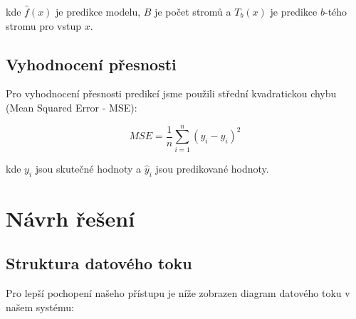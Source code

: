 \documentclass[a4paper,12pt]{article}
\begin{document}
kde $\hat{f}(x)$ je predikce modelu, $B$ je počet stromů a $T_b(x)$ je predikce $b$-tého stromu pro vstup $x$.

\subsection{Vyhodnocení přesnosti}
Pro vyhodnocení přesnosti predikcí jsme použili střední kvadratickou chybu (Mean Squared Error - MSE):

\begin{equation}
MSE = \frac{1}{n}\sum_{i=1}^{n}(y_i - \hat{y}_i)^2
\end{equation}

kde $y_i$ jsou skutečné hodnoty a $\hat{y}_i$ jsou predikované hodnoty.

\section{Návrh řešení}
\label{sec:design}

\subsection{Struktura datového toku}

Pro lepší pochopení našeho přístupu je níže zobrazen diagram datového toku v našem systému:
\end{document}
